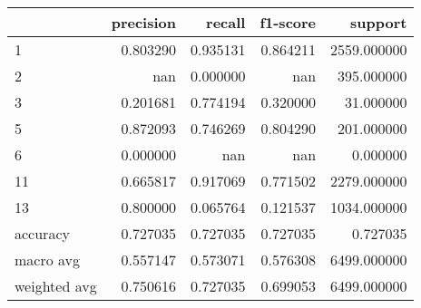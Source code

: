 \begin{tabular}{lrrrr}
\toprule
 & precision & recall & f1-score & support \\
\midrule
1 & 0.803290 & 0.935131 & 0.864211 & 2559.000000 \\
2 & nan & 0.000000 & nan & 395.000000 \\
3 & 0.201681 & 0.774194 & 0.320000 & 31.000000 \\
5 & 0.872093 & 0.746269 & 0.804290 & 201.000000 \\
6 & 0.000000 & nan & nan & 0.000000 \\
11 & 0.665817 & 0.917069 & 0.771502 & 2279.000000 \\
13 & 0.800000 & 0.065764 & 0.121537 & 1034.000000 \\
accuracy & 0.727035 & 0.727035 & 0.727035 & 0.727035 \\
macro avg & 0.557147 & 0.573071 & 0.576308 & 6499.000000 \\
weighted avg & 0.750616 & 0.727035 & 0.699053 & 6499.000000 \\
\bottomrule
\end{tabular}
